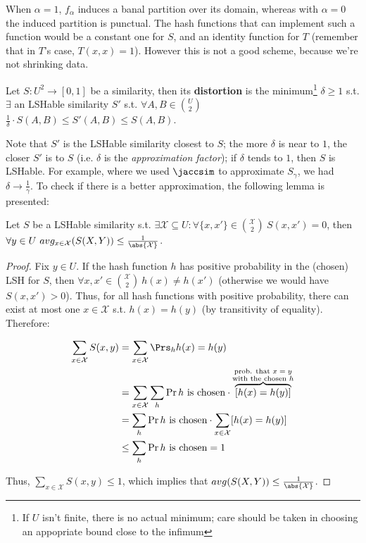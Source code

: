 When $\alpha = 1$, $f_\alpha$ induces a banal partition over its domain, whereas with $\alpha = 0$ the induced partition is punctual. The hash functions that can implement such a function would be a constant one for $S$, and an identity function for $T$ (remember that in $T$'s case, $T(x, x) = 1$). However this is not a good scheme, because we're not shrinking data.


\begin{defn}[Distortion]
	Let $S: U^2 \to [0, 1]$ be a similarity, then its \textbf{distortion} is the minimum\footnote{If $U$ isn't finite, there is no actual minimum; care should be taken in choosing an appopriate bound close to the infimum} $\delta \geq 1$ s.t. $\exists$ an LSHable similarity $S'$ s.t. $\forall {A, B} \in \binom{U}{2}$ $\frac{1}{\delta} \cdot S(A, B) \leq S'(A, B) \leq S(A, B)$.
\end{defn}

Note that $S'$ is the LSHable similarity closest to $S$; the more $\delta$ is near to $1$, the closer $S'$ is to $S$ (i.e. $\delta$ is the \textit{approximation factor}); if $\delta$ tends to $1$, then $S$ is LSHable. For example, where we used $\jaccsim$ to approximate $S_\gamma$, we had $\delta \to \frac{1}{\gamma}$. To check if there is a better approximation, the following lemma is presented:

\begin{lem} \label{l:center}
	Let $S$ be a LSHable similarity s.t. $\exists \mathcal{X} \subseteq U : \forall \{x, x'\} \in \binom{\mathcal{X}}{2} \ S(x, x')=0$, then $\forall y \in U \ avg_{x \in \mathcal{X}}(S(X, Y)) \leq \frac{1}{\abs{\mathcal{X}}}$.
\end{lem}

\begin{proof}
	Fix $y \in U$. If the hash function $h$ has positive probability in the (chosen) LSH for $S$, then $\forall {x, x'} \in \binom{\mathcal{X}}{2} \ h(x)\neq h(x')$ (otherwise we would have $S(x, x') > 0$). Thus, for all hash functions with positive probability, there can exist at most one $x \in \mathcal{X}$ s.t. $h(x) = h(y)$ (by transitivity of equality). Therefore:
	
	\begin{align*}
		\sum_{x \in \mathcal{X}}S(x, y) &= \sum_{x \in \mathcal{X}}\Prs_h{h(x) = h(y)} \\
		&= \sum_{x \in \mathcal{X}}\sum_{h}\Pr{h \text{ is chosen}} \cdot \overbrace{[h(x) = h(y)]}^{\substack{\text{prob. that $x = y$} \\ \text{with the chosen $h$}}} \\
		&= \sum_h \Pr{h \text{ is chosen}} \cdot \sum_{x \in \mathcal{X}}[h(x)=h(y)] \\
		&\leq \sum_h \Pr{h \text{ is chosen}} = 1 
	\end{align*}

	Thus, $\sum_{x \in \mathcal{X}}S(x, y) \leq 1$, which implies that $avg(S(X, Y)) \leq \frac{1}{\abs{\mathcal{X}}}$.
\end{proof}

